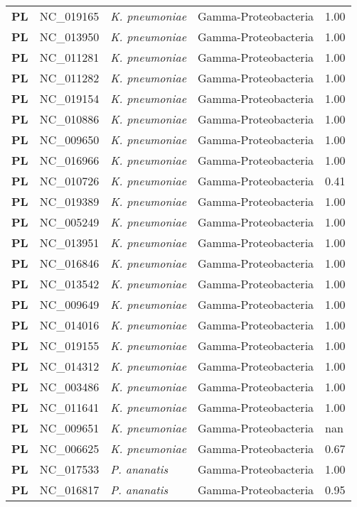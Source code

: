 \begin{adjustwidth}{-3cm}{2cm}
{\begin{supertabular}{>{\bfseries}l|p{0.1\textwidth}p{0.14\textwidth}l|l}
PL & NC\_019165 & \textit{K. pneumoniae} & Gamma-Proteobacteria & 1.00\\
PL & NC\_013950 & \textit{K. pneumoniae} & Gamma-Proteobacteria & 1.00\\
PL & NC\_011281 & \textit{K. pneumoniae} & Gamma-Proteobacteria & 1.00\\
PL & NC\_011282 & \textit{K. pneumoniae} & Gamma-Proteobacteria & 1.00\\
PL & NC\_019154 & \textit{K. pneumoniae} & Gamma-Proteobacteria & 1.00\\
PL & NC\_010886 & \textit{K. pneumoniae} & Gamma-Proteobacteria & 1.00\\
PL & NC\_009650 & \textit{K. pneumoniae} & Gamma-Proteobacteria & 1.00\\
PL & NC\_016966 & \textit{K. pneumoniae} & Gamma-Proteobacteria & 1.00\\
PL & NC\_010726 & \textit{K. pneumoniae} & Gamma-Proteobacteria & 0.41\\
PL & NC\_019389 & \textit{K. pneumoniae} & Gamma-Proteobacteria & 1.00\\
PL & NC\_005249 & \textit{K. pneumoniae} & Gamma-Proteobacteria & 1.00\\
PL & NC\_013951 & \textit{K. pneumoniae} & Gamma-Proteobacteria & 1.00\\
PL & NC\_016846 & \textit{K. pneumoniae} & Gamma-Proteobacteria & 1.00\\
PL & NC\_013542 & \textit{K. pneumoniae} & Gamma-Proteobacteria & 1.00\\
PL & NC\_009649 & \textit{K. pneumoniae} & Gamma-Proteobacteria & 1.00\\
PL & NC\_014016 & \textit{K. pneumoniae} & Gamma-Proteobacteria & 1.00\\
PL & NC\_019155 & \textit{K. pneumoniae} & Gamma-Proteobacteria & 1.00\\
PL & NC\_014312 & \textit{K. pneumoniae} & Gamma-Proteobacteria & 1.00\\
PL & NC\_003486 & \textit{K. pneumoniae} & Gamma-Proteobacteria & 1.00\\
PL & NC\_011641 & \textit{K. pneumoniae} & Gamma-Proteobacteria & 1.00\\
PL & NC\_009651 & \textit{K. pneumoniae} & Gamma-Proteobacteria & nan\\
PL & NC\_006625 & \textit{K. pneumoniae} & Gamma-Proteobacteria & 0.67\\
PL & NC\_017533 & \textit{P. ananatis} & Gamma-Proteobacteria & 1.00\\
PL & NC\_016817 & \textit{P. ananatis} & Gamma-Proteobacteria & 0.95\\

\end{supertabular}}
\end{adjustwidth}
